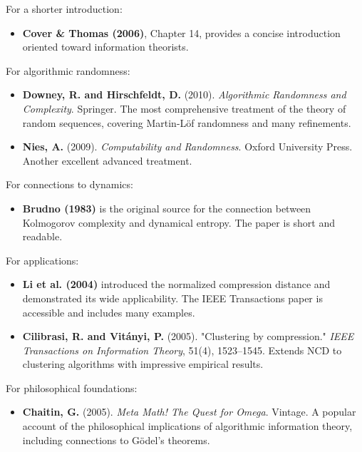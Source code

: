 For a shorter introduction:

\begin{itemize}
\item \textbf{Cover \& Thomas (2006)}, Chapter 14, provides a concise introduction oriented toward information theorists.
\end{itemize}

For algorithmic randomness:

\begin{itemize}
\item \textbf{Downey, R. and Hirschfeldt, D.} (2010). \textit{Algorithmic Randomness and Complexity}. Springer. The most comprehensive treatment of the theory of random sequences, covering Martin-Löf randomness and many refinements.
\end{itemize}

\begin{itemize}
\item \textbf{Nies, A.} (2009). \textit{Computability and Randomness}. Oxford University Press. Another excellent advanced treatment.
\end{itemize}

For connections to dynamics:

\begin{itemize}
\item \textbf{Brudno (1983)} is the original source for the connection between Kolmogorov complexity and dynamical entropy. The paper is short and readable.
\end{itemize}

For applications:

\begin{itemize}
\item \textbf{Li et al. (2004)} introduced the normalized compression distance and demonstrated its wide applicability. The IEEE Transactions paper is accessible and includes many examples.
\end{itemize}

\begin{itemize}
\item \textbf{Cilibrasi, R. and Vitányi, P.} (2005). "Clustering by compression." \textit{IEEE Transactions on Information Theory}, 51(4), 1523--1545. Extends NCD to clustering algorithms with impressive empirical results.
\end{itemize}

For philosophical foundations:

\begin{itemize}
\item \textbf{Chaitin, G.} (2005). \textit{Meta Math! The Quest for Omega}. Vintage. A popular account of the philosophical implications of algorithmic information theory, including connections to Gödel's theorems.
\end{itemize}
